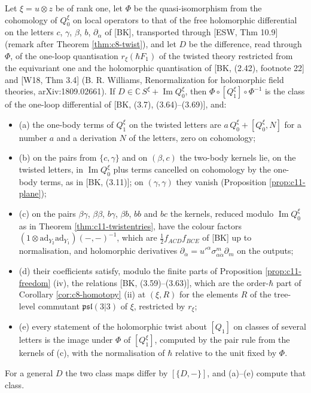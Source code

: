 \begin{theorem}
\label{thm:c11-twistcheck}
Let $\xi=u\otimes z$ be of rank one, let $\Phi$ be the quasi-isomorphism from the cohomology of $Q^\xi_0$ on local operators to that of the free holomorphic differential on the letters $c$, $\gamma$, $\beta$, $b$, $\partial_{\dot\alpha}$ of [BK], transported through [ESW, Thm 10.9] (remark after Theorem \ref{thm:c8-twist}), and let $D$ be the difference, read through $\Phi$, of the one-loop quantisation $r_\xi(\hbar F_1)$ of the twisted theory restricted from the equivariant one and the holomorphic quantisation of [BK, (2.42), footnote 22] and [W18, Thm 3.4] (B. R. Williams, Renormalization for holomorphic field theories, arXiv:1809.02661). If $D\in\mathbb C\,S^\xi+\operatorname{Im}Q^\xi_0$, then $\Phi\circ[Q^\xi_1]\circ\Phi^{-1}$ is the class of the one-loop differential of [BK, (3.7), (3.64)--(3.69)], and:
\begin{itemize}
\item (a) the one-body terms of $Q^\xi_1$ on the twisted letters are $a\,Q^\xi_0+[Q^\xi_0,N]$ for a number $a$ and a derivation $N$ of the letters, zero on cohomology;
\item (b) on the pairs from $\{c,\gamma\}$ and on $(\beta,c)$ the two-body kernels lie, on the twisted letters, in $\operatorname{Im}Q^\xi_0$ plus terms cancelled on cohomology by the one-body terms, as in [BK, (3.11)]; on $(\gamma,\gamma)$ they vanish (Proposition \ref{prop:c11-plane});
\item (c) on the pairs $\beta\gamma$, $\beta\beta$, $b\gamma$, $\beta b$, $bb$ and $bc$ the kernels, reduced modulo $\operatorname{Im}Q^\xi_0$ as in Theorem \ref{thm:c11-twistentries}, have the colour factors $(1\otimes\mathrm{ad}_{Y_2}\mathrm{ad}_{Y_1})(-,-)^{-1}$, which are $\tfrac12f_{ACD}f_{BCE}$ of [BK] up to normalisation, and holomorphic derivatives $\partial_{\dot\alpha}=u'^\alpha\sigma^m_{\alpha\dot\alpha}\partial_m$ on the outputs;
\item (d) their coefficients satisfy, modulo the finite parts of Proposition \ref{prop:c11-freedom} (iv), the relations [BK, (3.59)--(3.63)], which are the order-$\hbar$ part of Corollary \ref{cor:c8-homotopy} (ii) at $(\xi,R)$ for the elements $R$ of the tree-level commutant $\mathfrak{psl}(3|3)$ of $\xi$, restricted by $r_\xi$;
\item (e) every statement of the holomorphic twist about $[Q_1]$ on classes of several letters is the image under $\Phi$ of $[Q^\xi_1]$, computed by the pair rule from the kernels of (c), with the normalisation of $\hbar$ relative to the unit fixed by $\Phi$.
\end{itemize}
For a general $D$ the two class maps differ by $[\{D,-\}]$, and (a)--(e) compute that class.
\end{theorem}

